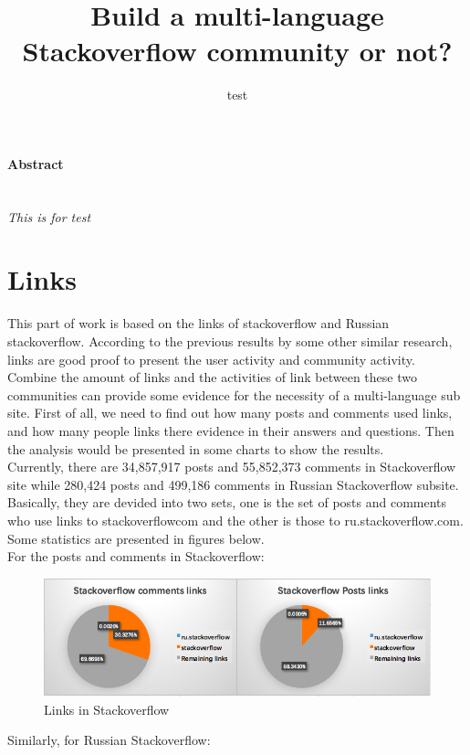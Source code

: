 \documentclass{article}
\author{test}
\title{Build a multi-language Stackoverflow community or not?}
\begin{document}
\maketitle
\paragraph{Abstract}
\emph{\\ This is for test}
\tableofcontents
\newpage
\section{Links}
	
This part of work is based on the links of stackoverflow and Russian stackoverflow. According to the previous results by some other similar research, links are good proof to present the user activity and community activity. Combine the amount of links and the activities of link between these two communities can provide some evidence for the necessity of a multi-language sub site. First of all, we need to find out how many posts and comments used links, and how many people links there evidence in their answers and questions. Then the analysis would be presented in some charts to show the results. 
\\Currently, there are 34,857,917 posts and 55,852,373 comments in Stackoverflow site while 280,424 posts and 499,186 comments in Russian Stackoverflow subsite. Basically, they are devided into two sets, one is the set of posts and comments who use links to stackoverflowcom and the other is those to ru.stackoverflow.com. Some statistics are presented in figures below.
\\For the posts and comments in Stackoverflow:
	\begin{figure}[H]
		\includegraphics[width = 1.0\textwidth]{link3.png}
		\caption{Links in Stackoverflow}
  	\end{figure}
Similarly, for Russian Stackoverflow:
\end{document}
